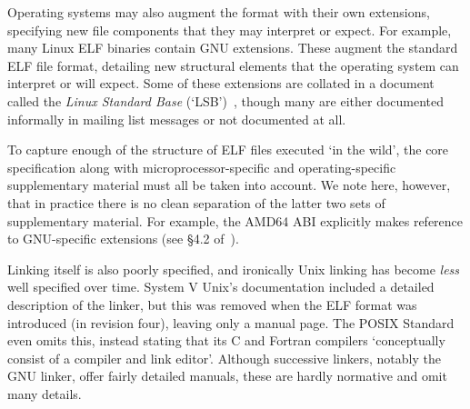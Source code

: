 \documentclass[preprint,10pt]{sigplanconf-pldi16}
\begin{document}
Operating systems may also augment the format with their own extensions, specifying new file components that they may interpret or expect. %
For example, many Linux ELF binaries contain GNU extensions.
These augment the standard ELF file format, detailing new structural elements that the operating system can interpret or will expect.
Some of these extensions are collated in a document called the \emph{Linux Standard Base} (`LSB')~\cite{linux-standard-base}, though many are either documented informally in mailing list messages or not documented at all.

To capture enough of the structure of ELF files executed `in the wild', the core specification along with microprocessor-specific and operating-specific supplementary material must all be taken into account.
We note here, however, that in practice there is no clean separation of the latter two sets of supplementary material.
For example, the AMD64 ABI explicitly makes reference to GNU-specific extensions (see \S4.2 of~\cite{amd64-abi}).

Linking itself is also poorly specified, and ironically Unix linking has become \emph{less} well specified over time.
System V Unix's documentation included a detailed description of the linker, but this was removed when the ELF format was introduced (in revision four), leaving only a manual page.
The POSIX Standard~\citep{ieee_standard_1988} even omits this, instead stating that its C and Fortran compilers `conceptually consist of a compiler and link editor'.
Although successive linkers, notably the GNU linker, offer fairly detailed manuals, these are hardly normative and omit many details.




\end{document}
